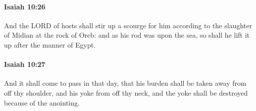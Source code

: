 		\paragraph{Isaiah 10:26} %
			\label{ISAIAH-10-26}

			And the LORD of hosts shall stir up a scourge for him according to the slaughter of Midian at the rock of Oreb: and as his rod was upon the sea, so shall he lift it up after the manner of Egypt.


		\paragraph{Isaiah 10:27} %
			\label{ISAIAH-10-27}

			And it shall come to pass in that day, that his burden shall be taken away from off thy shoulder, and his yoke from off thy neck, and the yoke shall be destroyed because of the anointing.

